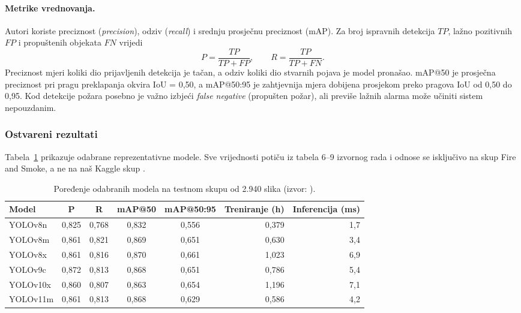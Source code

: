 \paragraph{Metrike vrednovanja.} Autori koriste preciznost (\emph{precision}), odziv (\emph{recall}) i srednju prosječnu preciznost (mAP). Za broj ispravnih detekcija $TP$, lažno pozitivnih $FP$ i propuštenih objekata $FN$ vrijedi
\begin{equation}
P = \frac{TP}{TP + FP}, \qquad R = \frac{TP}{TP + FN}.
\end{equation}
Preciznost mjeri koliki dio prijavljenih detekcija je tačan, a odziv koliki dio stvarnih pojava je model pronašao. mAP@50 je prosječna preciznost pri pragu preklapanja okvira IoU = 0,50, a mAP@50:95 je zahtjevnija mjera dobijena prosjekom preko pragova IoU od 0,50 do 0,95. Kod detekcije požara posebno je važno izbjeći \emph{false negative} (propušten požar), ali previše lažnih alarma može učiniti sistem nepouzdanim.

\subsubsection{Ostvareni rezultati}
Tabela~\ref{tab:dino} prikazuje odabrane reprezentativne modele. Sve vrijednosti potiču iz tabela 6--9 izvornog rada i odnose se isključivo na skup Fire and Smoke, a ne na naš Kaggle skup \cite{ramos}.

\begin{table}[H]
\centering
\small
\begin{tabular}{@{}lccccrr@{}}
  \toprule
  \textbf{Model} & \textbf{P} & \textbf{R} & \textbf{mAP@50} & \textbf{mAP@50:95} & \textbf{Treniranje (h)} & \textbf{Inferencija (ms)}\\
  \midrule
  YOLOv8n  & 0,825 & 0,768 & 0,832 & 0,556 & 0,379 & 1,7\\
  YOLOv8m  & 0,861 & 0,821 & 0,869 & 0,651 & 0,630 & 3,4\\
  YOLOv8x  & 0,861 & 0,816 & 0,870 & 0,661 & 1,023 & 6,9\\
  YOLOv9c  & 0,872 & 0,813 & 0,868 & 0,651 & 0,786 & 5,4\\
  YOLOv10x & 0,860 & 0,807 & 0,863 & 0,654 & 1,196 & 7,1\\
  YOLOv11m & 0,861 & 0,813 & 0,868 & 0,629 & 0,586 & 4,2\\
  \bottomrule
\end{tabular}
\caption{Poređenje odabranih modela na testnom skupu od 2.940 slika (izvor: \cite{ramos}).}
\label{tab:dino}
\end{table}

